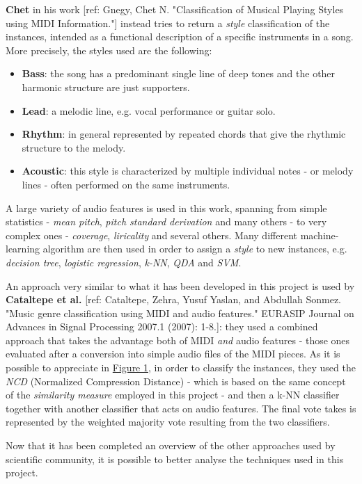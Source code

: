 \documentclass[a4paper]{article}
\begin{document}
	\textbf{Chet} in his work [ref: Gnegy, Chet N. "Classification of Musical Playing Styles using MIDI Information."] instead tries to return a \textit{style} classification of the instances, intended as a functional description of a specific instruments in a song. More precisely, the styles used are the following: 
	\begin{itemize}
		\item \textbf{Bass}: the song has a predominant single line of deep tones and the other harmonic structure are just supporters.
		\item \textbf{Lead}: a melodic line, e.g. vocal performance or guitar solo.
		\item \textbf{Rhythm}: in general represented by repeated chords that give the rhythmic structure to the melody.
		\item \textbf{Acoustic}: this style is characterized by multiple individual notes - or melody lines - often performed on the same instruments.
	\end{itemize}
	A large variety of audio features is used in this work, spanning from simple statistics - \textit{mean pitch}, \textit{pitch standard derivation} and many others - to very complex ones - \textit{coverage}, \textit{liricality} and several others. Many different machine-learning algorithm are then used in order to assign a \textit{style} to new instances, e.g. \textit{decision tree}, \textit{logistic regression}, \textit{k-NN}, \textit{QDA} and \textit{SVM}.
	
	An approach very similar to what it has been developed in this project is used by \textbf{Cataltepe et al.} [ref: Cataltepe, Zehra, Yusuf Yaslan, and Abdullah Sonmez. "Music genre classification using MIDI and audio features." EURASIP Journal on Advances in Signal Processing 2007.1 (2007): 1-8.]: they used a combined approach that takes the advantage both of MIDI \textit{and} audio features - those ones evaluated after a conversion into simple audio files of the MIDI pieces. As it is possible to appreciate in \hyperref[fig:audio_and_NCD]{Figure 1}, in order to classify the instances, they used the \textit{NCD}  (Normalized Compression Distance) - which is based on the same concept of the \textit{similarity measure} employed in this project - and then a k-NN classifier together with another classifier that acts on audio features. The final vote takes is represented by the weighted majority vote resulting from the two classifiers.
	
	Now that it has been completed an overview of the other approaches used by scientific community, it is possible to better analyse the techniques used in this project.
	
\end{document}
